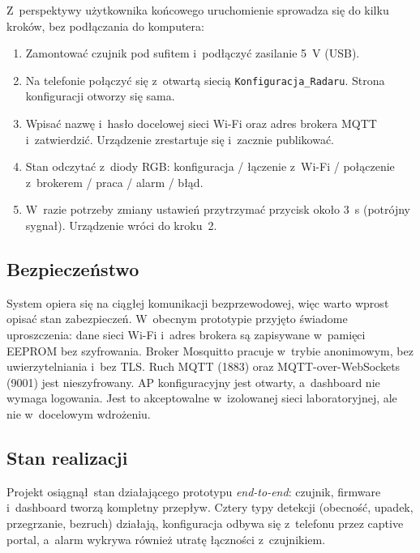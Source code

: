 \documentclass[11pt,a4paper]{article}
\begin{document}
Z~perspektywy u\.zytkownika ko\'ncowego uruchomienie sprowadza si\k e do
kilku krok\'ow, bez pod\l \k aczania do komputera:

\begin{enumerate}[leftmargin=1.6em]
  \item Zamontowa\'c czujnik pod sufitem i~pod\l \k aczy\'c zasilanie 5~V (USB).
  \item Na telefonie po\l \k aczy\'c si\k e z~otwart\k a sieci\k a
        \texttt{Konfiguracja\_Radaru}. Strona konfiguracji otworzy si\k e sama.
  \item Wpisa\'c nazw\k e i~has\l o docelowej sieci Wi-Fi oraz adres brokera MQTT
        i~zatwierdzi\'c. Urz\k adzenie zrestartuje si\k e i~zacznie publikowa\'c.
  \item Stan odczyta\'c z~diody RGB: konfiguracja / \l \k aczenie z~Wi-Fi /
        po\l \k aczenie z~brokerem / praca / alarm / b\l \k ad.
  \item W~razie potrzeby zmiany ustawie\'n przytrzyma\'c przycisk oko\l o 3~s
        (potr\'ojny sygna\l). Urz\k adzenie wr\'oci do kroku~2.
\end{enumerate}

\subsection{Bezpiecze\'nstwo}

System opiera si\k e na ci\k ag\l ej komunikacji bezprzewodowej, wi\k ec warto
wprost opisa\'c stan zabezpiecze\'n. W~obecnym prototypie przyj\k eto \'swiadome
uproszczenia: dane sieci Wi-Fi i~adres brokera s\k a zapisywane w~pami\k eci
EEPROM bez szyfrowania. Broker Mosquitto pracuje
w~trybie anonimowym, bez uwierzytelniania i~bez TLS. Ruch MQTT (1883) oraz
MQTT-over-WebSockets (9001) jest nieszyfrowany. AP konfiguracyjny jest otwarty,
a~dashboard nie wymaga logowania. Jest to akceptowalne w~izolowanej sieci
laboratoryjnej, ale nie w~docelowym wdro\.zeniu.

\subsection{Stan realizacji}

Projekt osi\k agn\k a\l\ stan dzia\l aj\k acego prototypu \emph{end-to-end}: czujnik,
firmware i~dashboard tworz\k a kompletny przep\l yw. Cztery typy detekcji
(obecno\'s\'c, upadek, przegrzanie, bezruch) dzia\l aj\k a, konfiguracja odbywa si\k e
z~telefonu przez captive portal, a~alarm wykrywa r\'ownie\.z utrat\k e \l \k aczno\'sci
z~czujnikiem.
\end{document}
